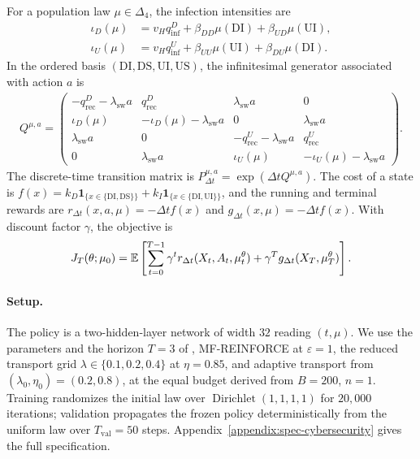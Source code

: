For a population law $\mu\in\Delta_4$, the infection intensities are
\begin{align}
    \iota_D(\mu)
    &=
    v_Hq_{\mathrm{inf}}^D+\beta_{DD}\mu(\mathrm{DI})+\beta_{UD}\mu(\mathrm{UI}),
    \\
    \iota_U(\mu)
    &=
    v_Hq_{\mathrm{inf}}^U+\beta_{UU}\mu(\mathrm{UI})+\beta_{DU}\mu(\mathrm{DI}).
\end{align}
In the ordered basis $(\mathrm{DI},\mathrm{DS},\mathrm{UI},\mathrm{US})$, the infinitesimal generator associated with action $a$ is
\begin{align}
    Q^{\mu,a}
    =
    \begin{pmatrix}
        -q_{\mathrm{rec}}^D-\lambda_{\mathrm{sw}}a & q_{\mathrm{rec}}^D & \lambda_{\mathrm{sw}}a & 0\\
        \iota_D(\mu) & -\iota_D(\mu)-\lambda_{\mathrm{sw}}a & 0 & \lambda_{\mathrm{sw}}a\\
        \lambda_{\mathrm{sw}}a & 0 & -q_{\mathrm{rec}}^U-\lambda_{\mathrm{sw}}a & q_{\mathrm{rec}}^U\\
        0 & \lambda_{\mathrm{sw}}a & \iota_U(\mu) & -\iota_U(\mu)-\lambda_{\mathrm{sw}}a
    \end{pmatrix}.
\end{align}
The discrete-time transition matrix is $P_{\Delta t}^{\mu,a}=\exp(\Delta t Q^{\mu,a})$. The cost of a state is $f(x)=k_D\mathbf 1_{\{x\in\{\mathrm{DI},\mathrm{DS}\}\}}+k_I\mathbf 1_{\{x\in\{\mathrm{DI},\mathrm{UI}\}\}}$,
and the running and terminal rewards are $r_{\Delta t}(x,a,\mu)=-\Delta t f(x)$ and $g_{\Delta t}(x,\mu)=-\Delta t f(x)$. With discount factor $\gamma$, the objective is
\begin{align}
    J_T(\theta;\mu_0)
    =
    \mathbb{E}\left[
        \sum_{t=0}^{T-1}\gamma^t r_{\Delta t}(X_t,A_t,\mu_t^\theta)
        +\gamma^Tg_{\Delta t}(X_T,\mu_T^\theta)
    \right].
\end{align}

\paragraph{Setup.}
The policy is a two-hidden-layer network of width $32$ reading $(t,\mu)$. We use the parameters and the horizon $T=3$ of \cite{meunier2026model}, MF-REINFORCE at $\varepsilon=1$, the reduced transport grid $\lambda\in\{0.1,0.2,0.4\}$ at $\eta=0.85$, and adaptive transport from $(\lambda_0,\eta_0)=(0.2,0.8)$, at the equal budget derived from $B=200$, $n=1$. Training randomizes the initial law over $\operatorname{Dirichlet}(1,1,1,1)$ for $20{,}000$ iterations; validation propagates the frozen policy deterministically from the uniform law over $T_{\mathrm{val}}=50$ steps. Appendix~\ref{appendix:spec-cybersecurity} gives the full specification.

